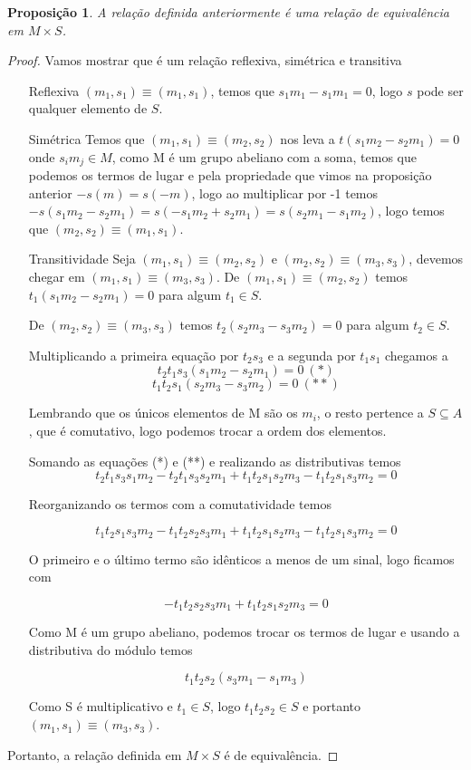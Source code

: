 \documentclass[10pt,a4paper]{article}
\newtheorem{proposition}[theorem]{Proposição}
\begin{document}
\begin{proposition}
	A relação definida anteriormente é uma relação de equivalência em $M \times S$.
\end{proposition}

\begin{proof} Vamos mostrar que é um relação reflexiva, simétrica e transitiva
	\begin{enumerate}
		\item [Reflexiva]  $(m_1,s_1) \equiv (m_1, s_1)$, temos que $s_1m_1-s_1m_1=0$, logo $s$ pode ser qualquer elemento de $S$.
		
		
		\item [Simétrica] Temos que $(m_1,s_1) \equiv (m_2, s_2)$ nos leva a $t(s_1m_2-s_2m_1)=0$ onde $s_im_j \in M$, como M é um grupo abeliano com a soma, temos que podemos os termos de lugar e pela propriedade que vimos na proposição anterior $-s(m)=s(-m)$, logo ao multiplicar por -1 temos $-s(s_1m_2-s_2m_1)=s(-s_1m_2+s_2m_1)=s(s_2m_1-s_1m_2)$, logo temos que $(m_2,s_2) \equiv (m_1, s_1)$.
		
		
		\item [Transitividade] Seja $(m_1,s_1) \equiv (m_2,s_2)$ e $(m_2,s_2) \equiv (m_3,s_3)$, devemos chegar em $(m_1,s_1) \equiv (m_3,s_3)$.
		De $(m_1,s_1) \equiv (m_2,s_2)$ temos $t_1(s_1m_2-s_2m_1)=0$ para algum $t_1 \in S$.
		
		De $(m_2,s_2) \equiv (m_3,s_3)$ temos $t_2(s_2m_3-s_3m_2)=0$ para algum $t_2 \in S$.
		
		Multiplicando a primeira equação por $t_2s_3$ e a segunda por $t_1s_1$ chegamos a 
		$$t_2t_1s_3(s_1m_2-s_2m_1)=0 \ (*)$$
		$$t_1t_2s_1(s_2m_3-s_3m_2)=0 \ (**)$$
		
		Lembrando que os únicos elementos de M são os $m_i$, o resto pertence a $S \subseteq A$, que é comutativo, logo podemos trocar a ordem dos elementos.
		
		Somando as equações (*) e (**) e realizando as distributivas temos 
		$$t_2t_1s_3s_1m_2-t_2t_1s_3s_2m_1+t_1t_2s_1s_2m_3-t_1t_2s_1s_3m_2=0$$
		
		Reorganizando os termos com a comutatividade temos
		
		$$t_1t_2s_1s_3m_2-t_1t_2s_2s_3m_1+t_1t_2s_1s_2m_3-t_1t_2s_1s_3m_2=0$$
		
		O primeiro e o último termo são idênticos a menos de um sinal, logo ficamos com 
		
		$$-t_1t_2s_2s_3m_1+t_1t_2s_1s_2m_3=0$$
		
		Como M é um grupo abeliano, podemos trocar os termos de lugar e usando a distributiva do módulo temos 
		
		$$t_1t_2s_2(s_3m_1-s_1m_3)$$
		
		Como S é multiplicativo e $t_1 \in S$, logo $t_1t_2s_2 \in S$ e portanto $(m_1,s_1) \equiv (m_3, s_3)$.
	\end{enumerate}
	
	Portanto, a relação definida em $M \times S$ é de equivalência.
	
\end{proof}
\end{document}
